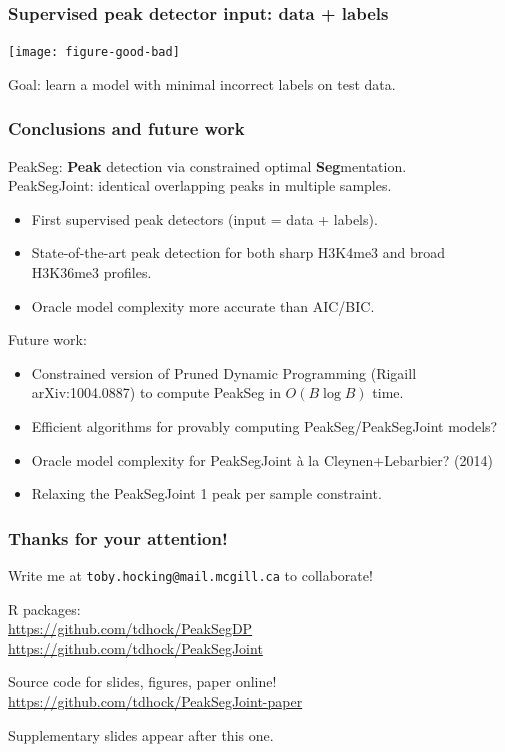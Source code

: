 \documentclass{beamer}
\begin{document}
\begin{frame}
  \frametitle{Supervised peak detector input: data + labels}

  \texttt{[image: figure-good-bad]}

  Goal: learn a model with minimal incorrect labels on test data.

\end{frame}

\begin{frame}
  \frametitle{Conclusions and future work}
  PeakSeg: \textbf{Peak} detection via constrained optimal
  \textbf{Seg}mentation.\\
  PeakSegJoint: identical overlapping peaks in multiple samples.
  \begin{itemize}
  \item First supervised peak detectors (input = data + labels).
  \item State-of-the-art peak detection for both sharp H3K4me3 and
    broad H3K36me3 profiles.
  \item Oracle model complexity more accurate than AIC/BIC.
  \end{itemize}
  Future work:
  \begin{itemize}
  \item Constrained version of Pruned Dynamic Programming (Rigaill
    arXiv:1004.0887) to compute PeakSeg in $O(B\log B)$ time.
  \item Efficient algorithms for provably computing
    PeakSeg/PeakSegJoint models?
  \item Oracle model complexity for PeakSegJoint \`a la
    Cleynen+Lebarbier?  (2014)
  \item Relaxing the PeakSegJoint 1 peak per sample constraint.
  \end{itemize}
\end{frame}

\begin{frame}
  \frametitle{Thanks for your attention!}
  Write me at \alert{\texttt{toby.hocking@mail.mcgill.ca}} to collaborate!

  \vskip 1cm

  R packages:\\
  \url{https://github.com/tdhock/PeakSegDP}\\
  \url{https://github.com/tdhock/PeakSegJoint}

  \vskip 1cm

  Source code for slides, figures, paper online!\\
  \small
  \url{https://github.com/tdhock/PeakSegJoint-paper}
  \vskip 1cm

  Supplementary slides appear after this one.

\end{frame}
\end{document}
